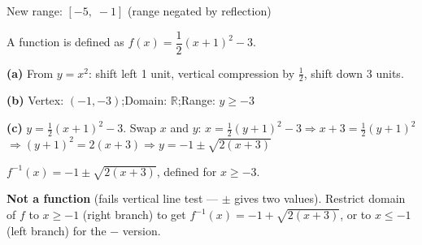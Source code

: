 \documentclass[addpoints]{exam}
\begin{document}
\begin{questions}
\begin{solution}[9cm]
New range: $[-5,\; -1]$ (range negated by reflection)
\end{solution}

\question A function is defined as $f(x) = \dfrac{1}{2}(x + 1)^2 - 3$.
\begin{solution}[9cm]
\textbf{(a)} From $y = x^2$: shift left 1 unit, vertical compression by $\tfrac{1}{2}$,
shift down 3 units.

\textbf{(b)} Vertex: $(-1, -3)$;\quad Domain: $\mathbb{R}$;\quad Range: $y \geq -3$

\textbf{(c)} $y = \tfrac{1}{2}(x+1)^2 - 3$. Swap $x$ and $y$:
$x = \tfrac{1}{2}(y+1)^2 - 3 \Rightarrow x + 3 = \tfrac{1}{2}(y+1)^2$
$\Rightarrow (y+1)^2 = 2(x+3) \Rightarrow y = -1 \pm\sqrt{2(x+3)}$

$f^{-1}(x) = -1 \pm\sqrt{2(x+3)}$, defined for $x \geq -3$.

\textbf{Not a function} (fails vertical line test — $\pm$ gives two values).
Restrict domain of $f$ to $x \geq -1$ (right branch) to get
$f^{-1}(x) = -1 + \sqrt{2(x+3)}$, or to $x \leq -1$ (left branch) for the
$-$ version.
\end{solution}

\end{questions}
\end{document}
